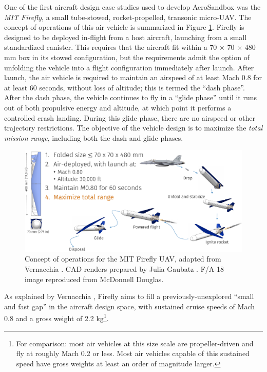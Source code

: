 One of the first aircraft design case studies used to develop AeroSandbox was the \emph{MIT Firefly}, a small tube-stowed, rocket-propelled, transonic micro-UAV. The concept of operations of this air vehicle is summarized in Figure \ref{fig:firefly_conops}. Firefly is designed to be deployed in-flight from a host aircraft, launching from a small standardized canister. This requires that the aircraft fit within a 70 $\times$ 70 $\times$ 480 mm box in its stowed configuration, but the requirements admit the option of unfolding the vehicle into a flight configuration immediately after launch. After launch, the air vehicle is required to maintain an airspeed of at least Mach 0.8 for at least 60 seconds, without loss of altitude; this is termed the ``dash phase''. After the dash phase, the vehicle continues to fly in a ``glide phase'' until it runs out of both propulsive energy and altitude, at which point it performs a controlled crash landing. During this glide phase, there are no airspeed or other trajectory restrictions. The objective of the vehicle design is to maximize the \emph{total mission range}, including both the dash and glide phases.

\begin{figure}[H]
    \centering
    \includegraphics[width=\textwidth]{../figures/firefly_conops-crop.pdf}
    \caption{Concept of operations for the MIT Firefly UAV, adapted from Vernacchia \cite{vernacchia_development_2020}. CAD renders prepared by Julia Gaubatz \cite{gaubatz_design_2024}. F/A-18 image reproduced from McDonnell Douglas.}
    \label{fig:firefly_conops}
\end{figure}

As explained by Vernacchia \cite{vernacchia_development_2020}, Firefly aims to fill a previously-unexplored ``small and fast gap'' in the aircraft design space, with sustained cruise speeds of Mach 0.8 and a gross weight of 2.2 kg\footnote{For comparison: most air vehicles at this size scale are propeller-driven and fly at roughly Mach 0.2 or less. Most air vehicles capable of this sustained speed have gross weights at least an order of magnitude larger.}.

